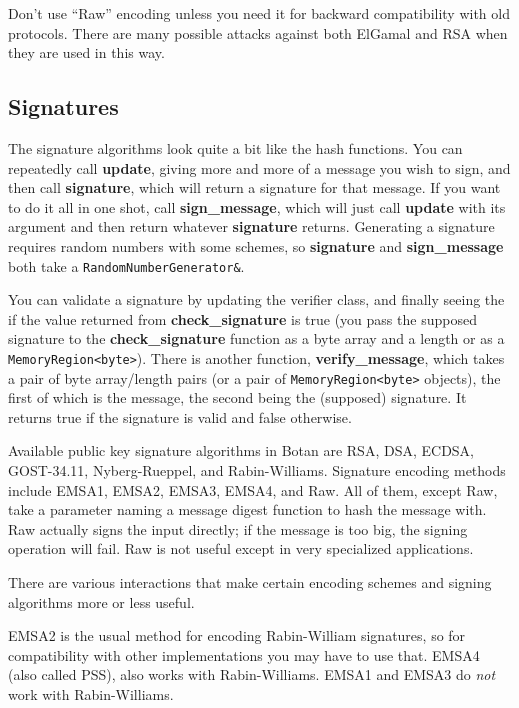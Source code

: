\documentclass{article}
\newcommand{\function}[1]{\textbf{#1}}
\newcommand{\type}[1]{\texttt{#1}}
\begin{document}
Don't use ``Raw'' encoding unless you need it for backward
compatibility with old protocols. There are many possible attacks
against both ElGamal and RSA when they are used in this way.

\subsection{Signatures}

The signature algorithms look quite a bit like the hash functions. You
can repeatedly call \function{update}, giving more and more of a
message you wish to sign, and then call \function{signature}, which
will return a signature for that message. If you want to do it all in
one shot, call \function{sign\_message}, which will just call
\function{update} with its argument and then return whatever
\function{signature} returns. Generating a signature requires random
numbers with some schemes, so \function{signature} and
\function{sign\_message} both take a \type{RandomNumberGenerator\&}.

You can validate a signature by updating the verifier class, and finally seeing
the if the value returned from \function{check\_signature} is true (you pass
the supposed signature to the \function{check\_signature} function as a byte
array and a length or as a \type{MemoryRegion<byte>}). There is another
function, \function{verify\_message}, which takes a pair of byte array/length
pairs (or a pair of \type{MemoryRegion<byte>} objects), the first of which is
the message, the second being the (supposed) signature. It returns true if the
signature is valid and false otherwise.

Available public key signature algorithms in Botan are RSA, DSA,
ECDSA, GOST-34.11, Nyberg-Rueppel, and Rabin-Williams. Signature
encoding methods include EMSA1, EMSA2, EMSA3, EMSA4, and Raw. All of
them, except Raw, take a parameter naming a message digest function to
hash the message with. Raw actually signs the input directly; if the
message is too big, the signing operation will fail. Raw is not useful
except in very specialized applications.

There are various interactions that make certain encoding schemes and
signing algorithms more or less useful.

EMSA2 is the usual method for encoding Rabin-William signatures, so
for compatibility with other implementations you may have to use
that. EMSA4 (also called PSS), also works with Rabin-Williams. EMSA1
and EMSA3 do \emph{not} work with Rabin-Williams.
\end{document}
